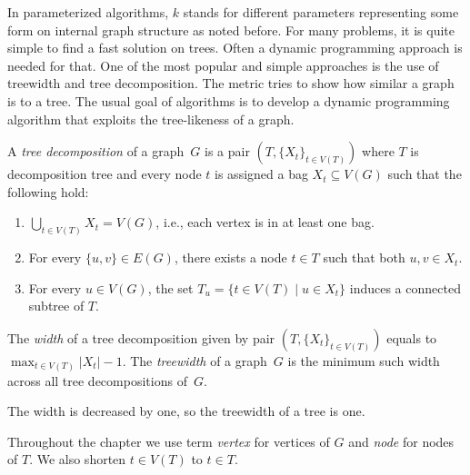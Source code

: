 In parameterized algorithms, \( k \) stands for different parameters
representing some form on internal graph structure as noted before.
%
For many problems, it is quite simple to find a fast solution on trees.
Often a dynamic programming approach is needed for that.
%
One of the most popular and simple approaches
is the use of treewidth and tree decomposition.
The metric tries to show how similar a graph is to a tree.
%
The usual goal of algorithms is to develop a dynamic programming algorithm
that exploits the tree-likeness of a graph.

%
\begin{definition}
	A \emph{tree decomposition} of a graph~\( G \) is
	a pair \( (T, {\{X_t\}}_{t \in V ( T )}) \)
	where \( T \) is decomposition tree and every node \( t \)
	is assigned a bag \( X_t \subseteq V(G) \) such that the following hold:
	\begin{enumerate}
		\item \( \bigcup_{t \in V(T)} X_t = V(G) \),
		      i.e., each vertex is in at least one bag.
		\item For every \( \{u,v\} \in E(G) \), there exists
		      a node \( t \in T \) such that both \( u, v \in X_t \).
		\item For every \( u \in V(G) \),
		      the set \( T_u = \{t \in V(T) \mid u \in X_t\} \)
		      induces a connected subtree of \( T \).
	\end{enumerate}
\end{definition}
%
\begin{definition}
	The \emph{width} of a tree decomposition given by pair
	\( (T, {\{X_t\}}_{t \in V ( T )}) \)
	equals to \( \max_{t\in V(T)} |X_t| - 1 \).
	The \emph{treewidth} of a graph~\( G \) is the minimum such width
	across all tree decompositions of~\( G \).
\end{definition}
%
The width is decreased by one, so the treewidth of a tree is one.

Throughout the chapter we use term \emph{vertex} for vertices of \( G \)
and \emph{node} for nodes of \( T \).
We also shorten \( t \in V(T) \) to \( t \in T \).

